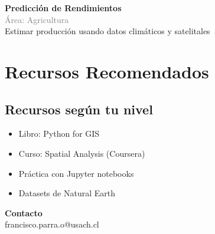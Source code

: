 \documentclass[11pt,a4paper]{article}
\begin{document}
\begin{tcolorbox}[colback=orange!5,colframe=darkorange,title={\small Proyecto Comercial \#2}]
\textbf{Predicción de Rendimientos}\\[0.2cm]
\textcolor{gray}{\small Área: Agricultura}\\[0.2cm]
Estimar producción usando datos climáticos y satelitales
\end{tcolorbox}


\section*{ Recursos Recomendados}

\subsection*{Recursos según tu nivel}

\begin{itemize}[leftmargin=*]
    \item Libro: Python for GIS
    \item Curso: Spatial Analysis (Coursera)
    \item Práctica con Jupyter notebooks
    \item Datasets de Natural Earth
\end{itemize}


\vspace{0.5cm}

\begin{tcolorbox}[colback=gray!10,colframe=gray!50]
\centering
\textbf{Contacto}\\[0.2cm]
 francisco.parra.o@usach.cl
\end{tcolorbox}
\end{document}
